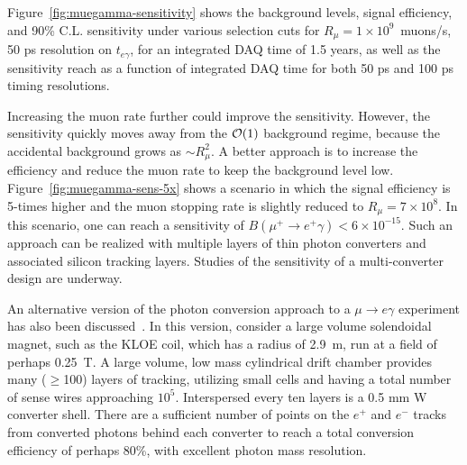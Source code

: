 Figure~\ref{fig:muegamma-sensitivity} shows the background levels, 
signal efficiency, and 90\%
C.L. sensitivity under various selection cuts for 
$R_\mu=1\times 10^{9}$~muons/s, 50 ps resolution on $t_{e\gamma}$, for
an integrated DAQ time of 1.5 years, as well as the sensitivity reach
as a function of integrated DAQ time for both 50 ps and 100 ps timing
resolutions. 

Increasing the muon rate further could improve the sensitivity. However,
the sensitivity quickly moves away from the ${\cal O}(1)$ background regime, because the accidental
background grows as $\sim R_\mu^2$. A better approach is to increase the
efficiency and reduce the muon rate to keep the background level low. 
Figure~\ref{fig:muegamma-sens-5x} 
shows a scenario in which the signal efficiency is 5-times higher
and the muon stopping rate is slightly reduced to $R_\mu=7\times 10^{8}$. 
In this scenario, one can reach a sensitivity of $B(\mu^+\to e^+\gamma)<6\times 10^{-15}$.
Such an approach can be realized with multiple layers of thin photon converters and associated silicon tracking layers. Studies of the sensitivity of a multi-converter design are underway.

An alternative version of the photon conversion approach to a $\mu \to e \gamma$ 
experiment has also been discussed~\cite{franco}. In this version, consider a large volume
solendoidal magnet, such as the KLOE coil, which has a radius of 2.9~m, run at a
field of perhaps 0.25~T. A large volume, low mass cylindrical drift chamber 
provides many ($\ge$100) layers of tracking, utilizing small cells and having 
a total number of sense wires approaching $10^5$. Interspersed every ten layers 
is a 0.5 mm W converter shell. There are a sufficient number of points on the 
$e^+$ and $e^-$ tracks from converted photons behind each converter to reach a
 total conversion efficiency of perhaps 80\%, with excellent photon mass 
resolution. 




